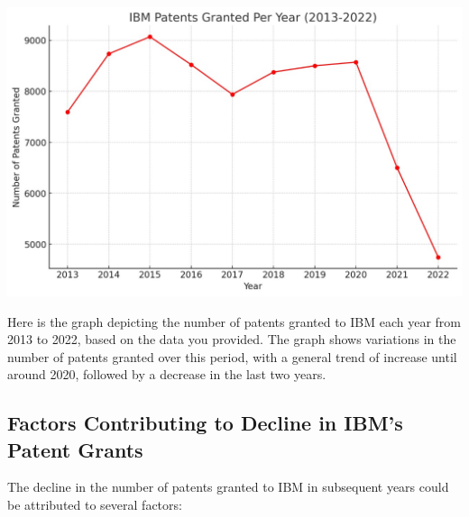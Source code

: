 \includegraphics[width=\textwidth]{image}

Here is the graph depicting the number of patents granted to IBM each year from 2013 to 2022, based on the data you provided. The graph shows variations in the number of patents granted over this period, with a general trend of increase until around 2020, followed by a decrease in the last two years.

\subsection{Factors Contributing to Decline in IBM's Patent Grants}

The decline in the number of patents granted to IBM in subsequent years could be attributed to several factors:

